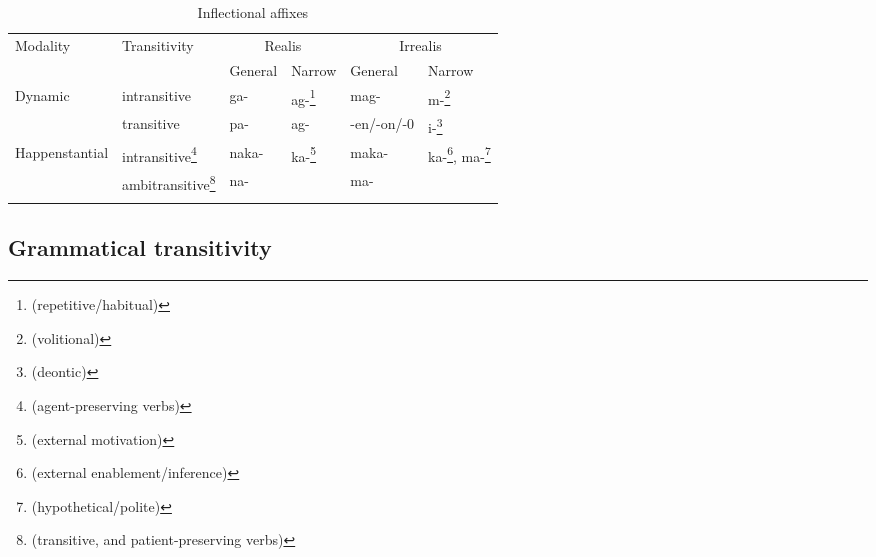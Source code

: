 \begin{table}
\small
\caption{Inflectional affixes} 
\label{tab:inflectionalaffixes}
\begin{tabular}{ll ll ll}
	\lsptoprule
	Modality &  Transitivity & \multicolumn{2}{c}{Realis} & \multicolumn{2}{c}{Irrealis} \\\cmidrule(lr){3-4}\cmidrule(lr){5-6}
	&  & General & Narrow & General & Narrow \\\midrule
	Dynamic & intransitive & ga- & ag-\footnote{(repetitive/habitual)} & mag- & m-\footnote{(volitional)} \\
	& transitive & pa- & ag- & {}-en/-on/-0 & i-\footnote{(deontic)} \\
	\tablevspace
	Happenstantial & intransitive\footnote{(agent-preserving verbs)} & naka- & ka-\footnote{(external motivation)} & maka- & ka-\footnote{(external enablement/inference)}, ma-\footnote{(hypothetical/polite)} \\
	& ambitransitive\footnote{(transitive, and patient-preserving verbs)} & na- &  & ma- & \\
	\lspbottomrule
\end{tabular}
\end{table}

\subsection{Grammatical transitivity}
\label{sec:grammaticaltransitivity}

